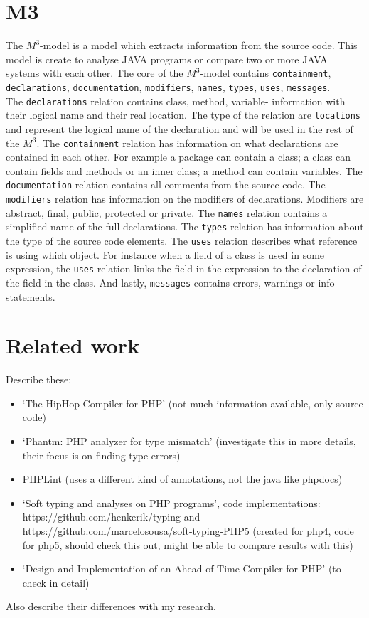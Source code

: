\documentclass[../main.tex]{subfiles}
\begin{document}
    \section{M3}
    The $M^3$-model is a model which extracts information from the source code\cite{Ana:13}.
    This model is create to analyse JAVA programs or compare two or more JAVA systems with each other.
    The core of the $M^3$-model contains \texttt{containment}, \texttt{declarations}, \texttt{documentation}, \texttt{modifiers}, \texttt{names}, \texttt{types}, \texttt{uses}, \texttt{messages}.
    \\
    The \texttt{declarations} relation contains class, method, variable- information with their logical name and their real location. The type of the relation are \texttt{locations} and represent the logical name of the declaration and will be used in the rest of the $M^3$.
    The \texttt{containment} relation has information on what declarations are contained in each other. For example a package can contain a class; a class can contain fields and methods or an inner class; a method can contain variables.    
    The \texttt{documentation} relation contains all comments from the source code. 
    The \texttt{modifiers} relation has information on the modifiers of declarations. Modifiers are abstract, final, public, protected or private.
    The \texttt{names} relation contains a simplified name of the full declarations.
    The \texttt{types} relation has information about the type of the source code elements.
    The \texttt{uses} relation describes what reference is using which object. For instance when a field of a class is used in some expression, the \texttt{uses} relation links the field in the expression to the declaration of the field in the class.
    And lastly, \texttt{messages} contains errors, warnings or info statements.
    
    \section{Related work}
    Describe these:
    \begin{itemize}
        \item `The HipHop Compiler for PHP'\cite{Zhao:12} (not much information available, only source code)
        \item `Phantm: PHP analyzer for type mismatch'\cite{Kne:10,Bar:10} (investigate this in more details, their focus is on finding type errors)
        \item PHPLint \footnotemark (uses a different kind of annotations, not the java like phpdocs)
        \item `Soft typing and analyses on PHP programs'\cite{}, code implementations: https://github.com/henkerik/typing and https://github.com/marcelosousa/soft-typing-PHP5 (created for php4, code for php5, should check this out, might be able to compare results with this)
        \item `Design and Implementation of an Ahead-of-Time Compiler for PHP'\cite{Big:10} (to check in detail)
    \end{itemize}
    Also describe their differences with my research.
    
\end{document}
